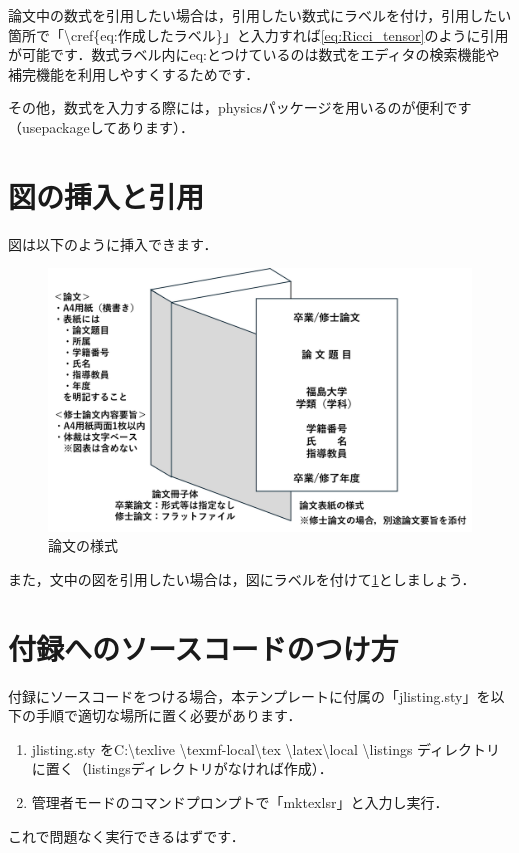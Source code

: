 	論文中の数式を引用したい場合は，引用したい数式にラベルを付け，引用したい箇所で「\textbackslash cref\{eq:作成したラベル\}」と入力すれば\cref{eq:Ricci_tensor}のように引用が可能です．数式ラベル内にeq:とつけているのは数式をエディタの検索機能や補完機能を利用しやすくするためです．

	その他，数式を入力する際には，physicsパッケージを用いるのが便利です（usepackageしてあります）．

	\section{図の挿入と引用}
	図は以下のように挿入できます．
		\begin{figure}[htbp]
			\centering
			\includegraphics[width=1.0\linewidth,keepaspectratio]{./images/論文様式.png}
			\caption{論文の様式}
			\label{fig:overview}
		\end{figure}

	また，文中の図を引用したい場合は，図にラベルを付けて\cref{fig:overview}としましょう．

	\section{付録へのソースコードのつけ方}
	付録にソースコードをつける場合，本テンプレートに付属の「jlisting.sty」を以下の手順で適切な場所に置く必要があります．

		\begin{enumerate}
			\item jlisting.sty をC:\textbackslash texlive \textbackslash texmf-local\textbackslash tex \textbackslash latex\textbackslash local \textbackslash listings ディレクトリに置く（listingsディレクトリがなければ作成）．
			\item 管理者モードのコマンドプロンプトで「mktexlsr」と入力し実行．
		\end{enumerate}

	これで問題なく実行できるはずです．

